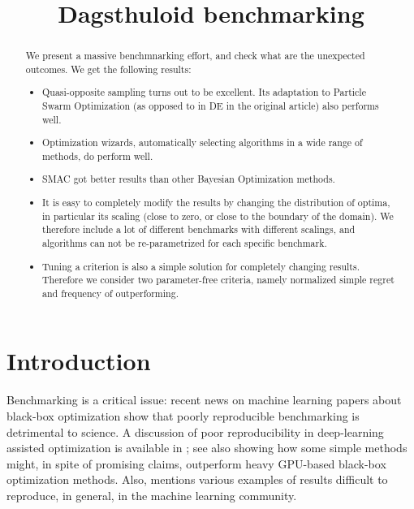 \documentclass{article}
\begin{document}
\title{Dagsthuloid benchmarking}

\maketitle


\begin{abstract}
We present a massive benchmnarking effort, and check what are the unexpected outcomes.
We get the following results:
\begin{itemize}
\item Quasi-opposite sampling turns out to be excellent\cite{quasiopposite}. Its adaptation to Particle Swarm
Optimization (as opposed to in DE in the original article) also performs well.
\item Optimization wizards, automatically selecting algorithms in a wide range of methods, do perform well.
\item SMAC got better results than other Bayesian Optimization methods.
\item It is easy to completely modify the results by changing the distribution of optima, in particular its scaling
(close to zero, or close to the boundary of the domain). We therefore include a lot of different benchmarks with
different scalings, and algorithms can not be re-parametrized for each specific benchmark.
\item Tuning a criterion is also a simple solution for completely changing results. Therefore we consider two
parameter-free criteria, namely normalized simple regret and frequency of outperforming.
\end{itemize}
\end{abstract}
\tableofcontents

\section{Introduction}

Benchmarking is a critical issue: recent news on machine learning papers about black-box optimization show that poorly reproducible benchmarking is detrimental to science.  A discussion of poor reproducibility in deep-learning assisted optimization is available in \cite{rlgoogle}; see also \cite{ecnassurvey,repronas,pham2018efficient,real2019regularized} showing how some simple methods might, in spite of promising claims, outperform heavy GPU-based black-box optimization methods. Also, \cite{leakage} mentions various examples of results difficult to reproduce, in general, in the machine learning community.
\end{document}
